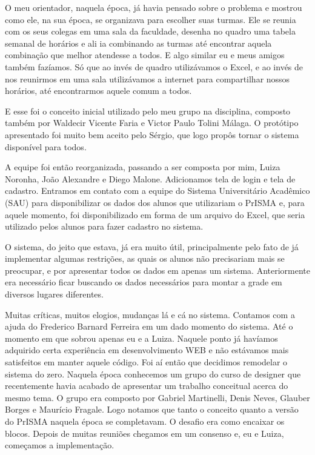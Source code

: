 \documentclass[graduacao,brazil]{ThesisPUC}
\begin{document}
O meu orientador, naquela época, já havia pensado sobre o problema e mostrou como ele, na sua época, se organizava para escolher suas turmas. Ele se reunia com os seus colegas em uma sala da faculdade, desenha no quadro uma tabela semanal de horários e ali ia combinando as turmas até encontrar aquela combinação que melhor atendesse a todos. E algo similar eu e meus amigos também fazíamos. Só que ao invés de quadro utilizávamos o Excel, e ao invés de nos reunirmos em uma sala utilizávamos a internet para compartilhar nossos horários, até encontrarmos aquele comum a todos.

E esse foi o conceito inicial utilizado pelo meu grupo na disciplina, composto também por Waldecir Vicente Faria e Victor Paulo Tolini Málaga. O protótipo apresentado foi muito bem aceito pelo Sérgio, que logo propôs tornar o sistema disponível para todos.

A equipe foi então reorganizada, passando a ser composta por mim, Luiza Noronha, João Alexandre e Diego Malone. Adicionamos tela de login e tela de cadastro. Entramos em contato com a equipe do Sistema Universitário Acadêmico (SAU) para disponibilizar os dados dos alunos que utilizariam o PrISMA e, para aquele momento, foi disponibilizado em forma de um arquivo do Excel, que seria utilizado pelos alunos para fazer cadastro no sistema.

O sistema, do jeito que estava, já era muito útil, principalmente pelo fato de já implementar algumas restrições, as quais os alunos não precisariam mais se preocupar, e por apresentar todos os dados em apenas um sistema. Anteriormente era necessário ficar buscando os dados necessários para montar a grade em diversos lugares diferentes.

Muitas críticas, muitos elogios, mudanças lá e cá no sistema. Contamos com a ajuda do Frederico Barnard Ferreira em um dado momento do sistema. Até o momento em que sobrou apenas eu e a Luiza. Naquele ponto já havíamos adquirido certa experiência em desenvolvimento WEB e não estávamos mais satisfeitos em manter aquele código. Foi aí então que decidimos remodelar o sistema do zero. Naquela época conhecemos um grupo do curso de designer que recentemente havia acabado de apresentar um trabalho conceitual acerca do mesmo tema. O grupo era composto por Gabriel Martinelli, Denis Neves, Glauber Borges e Maurício Fragale. Logo notamos que tanto o conceito quanto a versão do PrISMA naquela época se completavam. O desafio era como encaixar os blocos. Depois de muitas reuniões chegamos em um consenso e, eu e Luiza, começamos a implementação.
\end{document}
